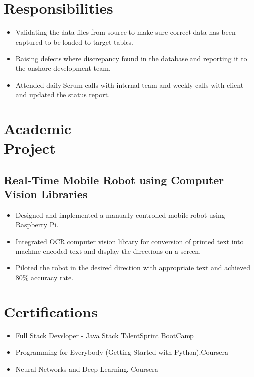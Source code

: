 \documentclass{mycv}
\begin{document}
\section{Responsibilities}

\begin{itemize}
  \item Validating the data files from source to make sure correct data has been captured to be loaded to target tables.
   \item Raising defects where discrepancy found in the database and reporting it to the onshore development team.
   \item Attended daily Scrum calls with internal team and weekly calls with client  and updated the status report.
   

\end{itemize}

\section{Academic \\ Project}
\subsection{Real-Time Mobile Robot using Computer Vision Libraries}
\vspace{-\parskip}%
\begin{itemize}
	\item Designed and implemented a manually controlled mobile robot using Raspberry Pi.
	\item Integrated OCR computer vision library for conversion of printed text into machine-encoded text and display the directions on a screen.
	\item Piloted the robot in the desired direction with appropriate text and achieved 80\% accuracy rate.
\end{itemize}


\section{Certifications}
\vspace{-\parskip}%
\begin{itemize}
	\item Full Stack Developer - Java Stack \hspace{5.5cm} TalentSprint BootCamp
\item Programming for Everybody (Getting Started with Python).\hspace{3.9cm}Coursera
	\item Neural Networks and Deep Learning. \hspace{7.1cm}Coursera
\end{itemize} 
\end{document}
